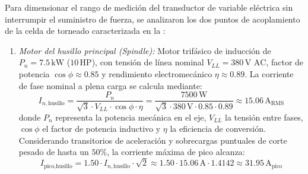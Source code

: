 Para dimensionar el rango de medición del transductor de variable eléctrica sin interrumpir el suministro de fuerza, se analizaron los dos puntos de acoplamiento de la celda de torneado caracterizada en la :

\begin{enumerate}
    \item \textit{Motor del husillo principal (Spindle):} Motor trifásico de inducción de $P_n = 7.5\,\text{kW}$ ($10\,\text{HP}$), con tensión de línea nominal $V_{LL} = 380\,\text{V AC}$, factor de potencia $\cos\phi \approx 0.85$ y rendimiento electromecánico $\eta \approx 0.89$. La corriente de fase nominal a plena carga se calcula mediante:
    \begin{equation}
    I_{n,\text{husillo}} = \frac{P_n}{\sqrt{3} \cdot V_{LL} \cdot \cos\phi \cdot \eta} = \frac{7500\,\text{W}}{\sqrt{3} \cdot 380\,\text{V} \cdot 0.85 \cdot 0.89} \approx 15.06\,\text{A}_{\text{RMS}}
    \label{eq:mp_corriente_husillo}
    \end{equation}
    \noindent donde $P_n$ representa la potencia mecánica en el eje, $V_{LL}$ la tensión entre fases, $\cos\phi$ el factor de potencia inductivo y $\eta$ la eficiencia de conversión. Considerando transitorios de aceleración y sobrecargas puntuales de corte pesado de hasta un $50\%$, la corriente máxima de pico alcanza:
    \begin{equation}
    I_{\text{pico,husillo}} = 1.50 \cdot I_{n,\text{husillo}} \cdot \sqrt{2} \approx 1.50 \cdot 15.06\,\text{A} \cdot 1.4142 \approx 31.95\,\text{A}_{\text{pico}}
    \label{eq:mp_corriente_pico_husillo}
    \end{equation}


\end{enumerate}
